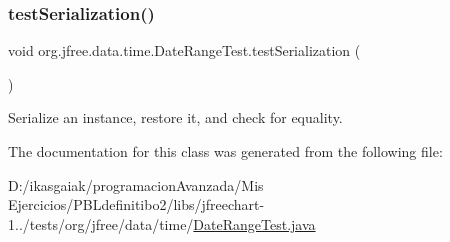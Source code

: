 \subsubsection{\texorpdfstring{test\+Serialization()}{testSerialization()}}
{\footnotesize\ttfamily void org.\+jfree.\+data.\+time.\+Date\+Range\+Test.\+test\+Serialization (\begin{DoxyParamCaption}{ }\end{DoxyParamCaption})}

Serialize an instance, restore it, and check for equality. 

The documentation for this class was generated from the following file\+:\begin{DoxyCompactItemize}
\item 
D\+:/ikasgaiak/programacion\+Avanzada/\+Mis Ejercicios/\+P\+B\+Ldefinitibo2/libs/jfreechart-\/1../tests/org/jfree/data/time/\mbox{\hyperlink{_date_range_test_8java}{Date\+Range\+Test.\+java}}\end{DoxyCompactItemize}
